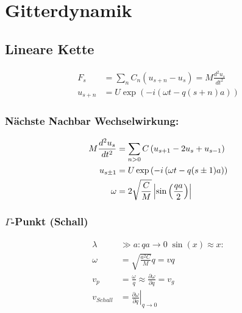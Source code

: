 \section{Gitterdynamik}


\subsection*{Lineare Kette}

\begin{equation*}
    \begin{aligned}
        F_s &= \sum_n C_n \left(u_{s+n} - u_s\right) = M \frac{d^2 u_s}{dt^2} \\
        u_{s+n} &= U \exp \left(-i\left(\omega t - q (s+n)a\right)\right)
    \end{aligned}
\end{equation*}

\subsubsection*{Nächste Nachbar Wechselwirkung:}
\begin{equation*}
    \begin{aligned}
        M \frac{d^2 u_s}{dt^2} &= \sum_{n>0} C \left(u_{s+1} -2u_s + u_{s-1}\right) \\
        u_{s \pm 1} &= U \exp \left(-i \left(\omega t - q (s \pm 1)a\right)\right) \\
        \omega &= 2 \sqrt{\frac{C}{M}} \left\vert\sin \left(\frac{qa}{2}\right)\right\vert
    \end{aligned}
\end{equation*}

\subsubsection*{$\Gamma$-Punkt (Schall)}
\begin{equation*}
    \begin{aligned}
        \lambda &\gg a: qa \rightarrow 0 \; \sin(x) \approx x: \\
        \omega &= \sqrt{\frac{a^2C}{M}}q = v q \\
        v_p &= \frac{\omega}{q} \approx \frac{\partial \omega}{\partial q} = v_g \\
        v_{Schall} &= \left.\frac{\partial \omega}{\partial q} \right|_{q \rightarrow 0}
    \end{aligned}
\end{equation*}

